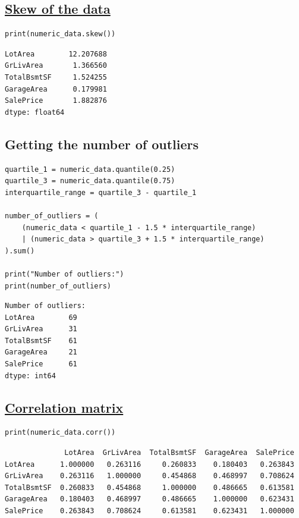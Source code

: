 \documentclass[11pt]{article}
\begin{document}
\subsection{\href{https://pandas.pydata.org/docs/reference/api/pandas.DataFrame.skew.html}{Skew of the data}}
\label{sec:orgc7740b7}
\begin{verbatim}
print(numeric_data.skew())
\end{verbatim}

\label{org411edc6}
\begin{verbatim}
LotArea        12.207688
GrLivArea       1.366560
TotalBsmtSF     1.524255
GarageArea      0.179981
SalePrice       1.882876
dtype: float64
\end{verbatim}


 \newpage
\subsection{Getting the number of outliers}
\label{sec:org5236dac}
\begin{verbatim}
quartile_1 = numeric_data.quantile(0.25)
quartile_3 = numeric_data.quantile(0.75)
interquartile_range = quartile_3 - quartile_1

number_of_outliers = (
    (numeric_data < quartile_1 - 1.5 * interquartile_range)
    | (numeric_data > quartile_3 + 1.5 * interquartile_range)
).sum()

print("Number of outliers:")
print(number_of_outliers)
\end{verbatim}

\label{org71985bc}
\begin{verbatim}
Number of outliers:
LotArea        69
GrLivArea      31
TotalBsmtSF    61
GarageArea     21
SalePrice      61
dtype: int64
\end{verbatim}
\subsection{\href{https://pandas.pydata.org/docs/reference/api/pandas.DataFrame.corr.html}{Correlation matrix}}
\label{sec:orgc9b2106}
\begin{verbatim}
print(numeric_data.corr())
\end{verbatim}

\label{org664b345}
\begin{verbatim}
              LotArea  GrLivArea  TotalBsmtSF  GarageArea  SalePrice
LotArea      1.000000   0.263116     0.260833    0.180403   0.263843
GrLivArea    0.263116   1.000000     0.454868    0.468997   0.708624
TotalBsmtSF  0.260833   0.454868     1.000000    0.486665   0.613581
GarageArea   0.180403   0.468997     0.486665    1.000000   0.623431
SalePrice    0.263843   0.708624     0.613581    0.623431   1.000000
\end{verbatim}
\end{document}
